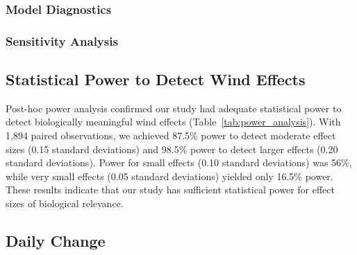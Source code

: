 \subsubsection{Model Diagnostics}


\subsubsection{Sensitivity Analysis}


\subsection{Statistical Power to Detect Wind Effects}

Post-hoc power analysis confirmed our study had adequate statistical power to detect biologically meaningful wind effects (Table~\ref{tab:power_analysis}). With 1,894 paired observations, we achieved 87.5\% power to detect moderate effect sizes (0.15 standard deviations) and 98.5\% power to detect larger effects (0.20 standard deviations). Power for small effects (0.10 standard deviations) was 56\%, while very small effects (0.05 standard deviations) yielded only 16.5\% power. These results indicate that our study has sufficient statistical power for effect sizes of biological relevance.



\subsection{Daily Change}

